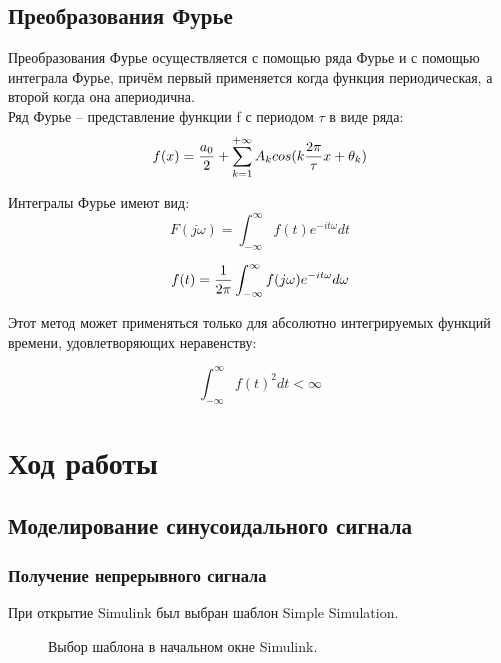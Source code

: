 \documentclass[a4paper,14pt]{extarticle}
\begin{document}
\subsection{Преобразования Фурье}

Преобразования Фурье осуществляется с помощью ряда Фурье и с 
помощью интеграла Фурье, причём первый применяется когда функция 
периодическая, а второй когда она апериодична.\\

Ряд Фурье -- представление функции f с периодом $\tau$ в виде 
ряда:
\begin{equation}
f(x) = {a_0\over 2} + \sum_{k=1}^{+\infty}A_k cos(k{2\pi\over 
\tau}x + \theta_k)
\end{equation}

Интегралы Фурье имеют вид:
\begin{equation}
F(j\omega) = \int_{-\infty}^{\infty} f(t) e^{-it\omega} dt
\end{equation}

\begin{equation}
f(t) = {{1}\over{2\pi}} \int_{-\infty}^{\infty} f(j\omega) e^{-it
\omega} d\omega
\end{equation}

Этот метод может применяться только для абсолютно интегрируемых 
функций времени, удовлетворяющих неравенству:

\begin{equation}
\int_{-\infty}^{\infty} {f(t)}^2  dt < \infty
\end{equation}

\section{Ход работы}

\subsection{Моделирование синусоидального сигнала}

\subsubsection{Получение непрерывного сигнала}

При открытие Simulink был выбран шаблон Simple Simulation.

\begin{figure}[H]
\caption{Выбор шаблона в начальном окне Simulink.}
\end{figure}
\end{document}
